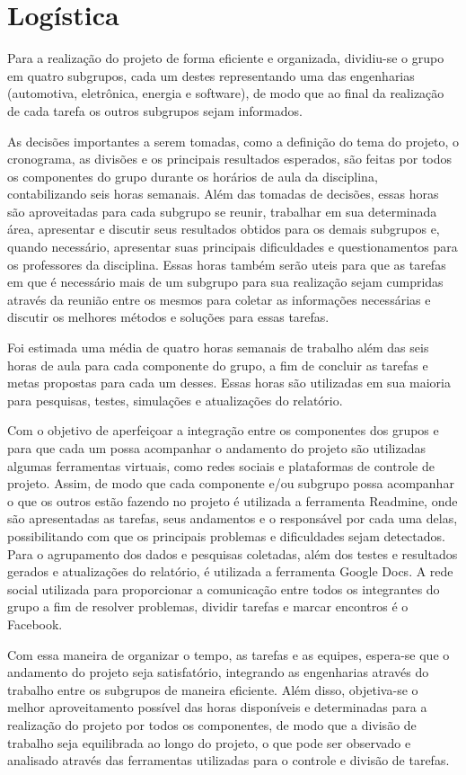 \chapter[Logística]{Logística}

Para a realização do projeto de forma eficiente e organizada, dividiu-se o grupo em quatro subgrupos, cada um destes representando uma das engenharias (automotiva, eletrônica, energia e software), de modo que ao final da realização de cada tarefa os outros subgrupos sejam informados.

As decisões importantes a serem tomadas, como a definição do tema do projeto, o cronograma, as divisões e os principais resultados esperados, são feitas por todos os componentes do grupo durante os horários de aula da disciplina, contabilizando seis horas semanais. Além das tomadas de decisões, essas horas são aproveitadas para cada subgrupo se reunir, trabalhar em sua determinada área, apresentar e discutir seus resultados obtidos para os demais subgrupos e, quando necessário, apresentar suas principais dificuldades e questionamentos para os professores da disciplina. Essas horas também serão uteis para que as tarefas em que é necessário mais de um subgrupo para sua realização sejam cumpridas através da reunião entre os mesmos para coletar as informações necessárias e discutir os melhores métodos e soluções para essas tarefas.

Foi estimada uma média de quatro horas semanais de trabalho além das seis horas de aula para cada componente do grupo, a fim de concluir as tarefas e metas propostas para cada um desses. Essas horas são utilizadas em sua maioria para pesquisas, testes, simulações e atualizações do relatório. 

Com o objetivo de aperfeiçoar a integração entre os componentes dos grupos e para que cada um possa acompanhar o andamento do projeto são utilizadas algumas ferramentas virtuais, como redes sociais e plataformas de controle de projeto. Assim, de modo que cada componente e/ou subgrupo possa acompanhar o que os outros estão fazendo no projeto é utilizada a ferramenta Readmine, onde são apresentadas as tarefas, seus andamentos e o responsável por cada uma delas, possibilitando com que os principais problemas e dificuldades sejam detectados. Para o agrupamento dos dados e pesquisas coletadas, além dos testes e resultados gerados e atualizações do relatório, é utilizada a ferramenta Google Docs. A rede social utilizada para proporcionar a comunicação entre todos os integrantes do grupo a fim de resolver problemas, dividir tarefas e marcar encontros é o Facebook.

Com essa maneira de organizar o tempo, as tarefas e as equipes, espera-se que o andamento do projeto seja satisfatório, integrando as engenharias através do trabalho entre os subgrupos de maneira eficiente. Além disso, objetiva-se o melhor aproveitamento possível das horas disponíveis e determinadas para a realização do projeto por todos os componentes, de modo que a divisão de trabalho seja equilibrada ao longo do projeto, o que pode ser observado e analisado através das ferramentas utilizadas para o controle e divisão de tarefas.

